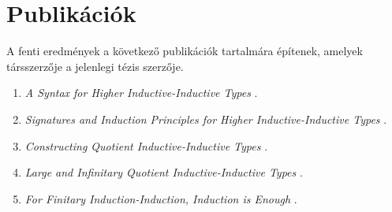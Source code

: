 \documentclass[12pt,a4paper,twosided]{article}
\begin{document}
\section{Publikációk}

A fenti eredmények a következő publikációk tartalmára építenek, amelyek
társszerzője a jelenlegi tézis szerzője.
\begin{enumerate}
  \item \emph{A Syntax for Higher Inductive-Inductive Types} \cite{hiit}.
  \item \emph{Signatures and Induction Principles for Higher Inductive-Inductive Types} \cite{hiits}.
  \item \emph{Constructing Quotient Inductive-Inductive Types} \cite{kaposi2019constructing}.
  \item \emph{Large and Infinitary Quotient Inductive-Inductive Types} \cite{iqiit}.
  \item \emph{For Finitary Induction-Induction, Induction is Enough} \cite{ind-ind-reduction}.
\end{enumerate}



\end{document}
